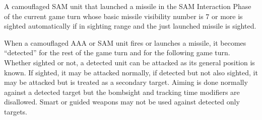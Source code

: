 A camouflaged SAM unit that launched a missile in the SAM Interaction Phase of the current game turn whose basic missile visibility number is 7 or more is sighted automatically if in sighting range and the just launched missile is sighted.

When a camouflaged AAA or SAM unit fires or launches a missile, it becomes “detected” for the rest of the game turn and for the following game turn. Whether sighted or not, a detected unit can be attacked as its general position is known. If sighted, it may be attacked normally, if detected but not also sighted, it may be attacked but is treated as a secondary target. Aiming is done normally against a detected target but the bombsight and tracking time modifiers are disallowed. Smart or guided weapons may not be used against detected only targets.

\fi

